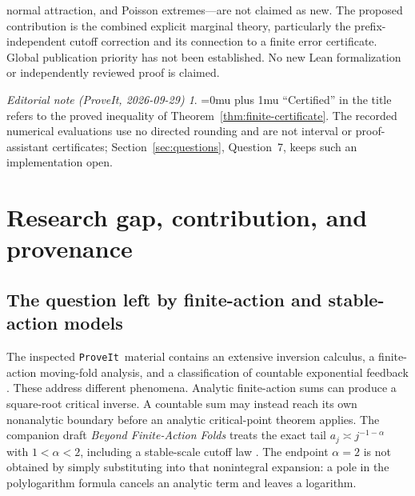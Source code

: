\documentclass[11pt,a4paper]{article}
\numberwithin{equation}{section}
\theoremstyle{definition}
\theoremstyle{remark}
\newtheorem*{ednoteinner}{Editorial note (ProveIt, 2026-09-29)}
\newenvironment{ednote}{\begin{ednoteinner}\sloppy\Urlmuskip=0mu plus 1mu\relax}{\end{ednoteinner}}
\newcommand{\repo}{\texttt{ProveIt}}
\begin{document}
normal attraction, and Poisson extremes---are not claimed as new. The proposed
contribution is the combined explicit marginal theory, particularly the
prefix-independent cutoff correction and its connection to a finite error
certificate. Global publication priority has not been established. No new Lean
formalization or independently reviewed proof is claimed.
\begin{ednote}
``Certified'' in the title refers to the proved inequality of
Theorem~\ref{thm:finite-certificate}. The recorded numerical evaluations use
no directed rounding and are not interval or proof-assistant certificates;
Section~\ref{sec:questions}, Question~7, keeps such an implementation open.
\end{ednote}

\clearpage
{\small\setlength{\parskip}{0pt}\tableofcontents}
\clearpage

\section{Research gap, contribution, and provenance}
\label{sec:intro}

\subsection{The question left by finite-action and stable-action models}
The inspected \repo\ material contains an extensive inversion calculus,
a finite-action moving-fold analysis, and a classification of countable
exponential feedback \cite{repo-index,repo-fold,repo-regularity}.
These address different phenomena. Analytic finite-action sums can produce a
square-root critical inverse. A countable sum may instead reach its own
nonanalytic boundary before an analytic critical-point theorem applies.
The companion draft \emph{Beyond Finite-Action Folds} treats the exact tail
\(a_j\asymp j^{-1-\alpha}\) with \(1<\alpha<2\), including a stable-scale cutoff
law \cite{prior-stable}. The endpoint \(\alpha=2\) is not obtained by simply
substituting into that nonintegral expansion: a pole in the polylogarithm
formula cancels an analytic term and leaves a logarithm.
\end{document}
